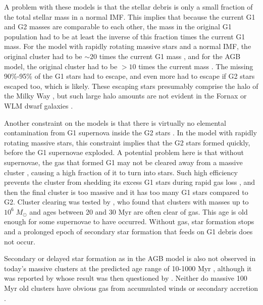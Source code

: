 \documentclass[12pt,preprint]{aastex}
\begin{document}

A problem with these models is that the stellar debris is only a small fraction of
the total stellar mass in a normal IMF. This implies that because the current G1
and G2 masses are comparable to each other, the mass in the original G1 population
had to be at least the inverse of this fraction times the current G1 mass. For the
model with rapidly rotating massive stars and a normal IMF, the original cluster
had to be $\sim20$ times the current G1 mass \citep{dec07b}, and for the AGB model,
the original cluster had to be $>10$ times the current mass \citep{dercole08}.  The
missing 90\%-95\% of the G1 stars had to escape, and even more had to escape if G2
stars escaped too, which is likely.  These escaping stars presumably comprise the
halo of the Milky Way \citep{prantzos06,martell11}, but such large halo amounts are
not evident in the Fornax or WLM dwarf galaxies
\citep{larsen12,larsen14,elmegreen12}.

Another constraint on the models is that there is virtually no elemental
contamination from G1 supernova inside the G2 stars \citep{char05,renzini13}. In
the model with rapidly rotating massive stars, this constraint implies that the G2
stars formed quickly, before the G1 supernovae exploded. A potential problem here
is that without supernovae, the gas that formed G1 may not be cleared away from a
massive cluster \citep{ginsburg16,lin16}, causing a high fraction of it to turn
into stars. Such high efficiency prevents the cluster from shedding its excess G1
stars during rapid gas loss \citep{krause16}, and then the final cluster is too
massive and it has too many G1 stars compared to G2. Cluster clearing was tested by
\cite{bastian14b}, who found that clusters with masses up to $10^6\;M_\odot$ and
ages between 20 and 30 Myr are often clear of gas. This age is old enough for some
supernovae to have occurred. Without gas, star formation stops and a prolonged
epoch of secondary star formation that feeds on G1 debris does not occur.

Secondary or delayed star formation as in the AGB model is also not observed in
today's massive clusters at the predicted age range of 10-1000 Myr
\citep{bastian13b,cabrera14}, although it was reported by \cite{li16} whose result
was then questioned by \cite{cabrera16a}. Neither do massive 100 Myr old clusters
have obvious gas from accumulated winds or secondary accretion \citep{bastian14a}.
\end{document}
